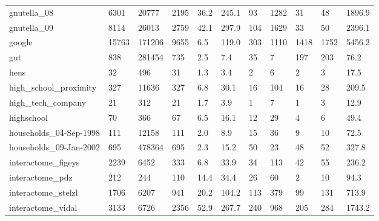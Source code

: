 \begin{longtable}{lllllllllll}
 gnutella\_08                                        & 6301       & 20777     & 2195  & 36.2   & 245.1  & 93    & 1282   & 31     & 48     & 1896.9  \\
 gnutella\_09                                        & 8114       & 26013     & 2759  & 42.1   & 297.9  & 104   & 1629   & 33     & 50     & 2396.1  \\
 google                                             & 15763      & 171206    & 9655  & 6.5    & 119.0  & 303   & 1110   & 1418   & 1752   & 5456.2  \\
 gut                                                & 838        & 281454    & 735   & 2.5    & 7.4    & 35    & 7      & 197    & 203    & 76.2    \\
 hens                                               & 32         & 496       & 31    & 1.3    & 3.4    & 2     & 6      & 2      & 3      & 17.5    \\
 high\_school\_proximity                              & 327        & 11636     & 327   & 6.8    & 30.1   & 16    & 104    & 16     & 28     & 209.5   \\
 high\_tech\_company                                  & 21         & 312       & 21    & 1.7    & 3.9    & 1     & 7      & 1      & 3      & 12.9    \\
 highschool                                         & 70         & 366       & 67    & 6.5    & 16.1   & 12    & 29     & 4      & 6      & 49.4    \\
 households\_04-Sep-1998                             & 111        & 12158     & 111   & 2.0    & 8.9    & 15    & 36     & 9      & 10     & 72.5    \\
 households\_09-Jan-2002                             & 695        & 478364    & 695   & 2.3    & 15.2   & 50    & 23     & 48     & 52     & 327.8   \\
 interactome\_figeys                                 & 2239       & 6452      & 333   & 6.8    & 33.9   & 34    & 113    & 42     & 55     & 236.2   \\
 interactome\_pdz                                    & 212        & 244       & 110   & 14.4   & 34.4   & 26    & 60     & 2      & 10     & 94.3    \\
 interactome\_stelzl                                 & 1706       & 6207      & 941   & 20.2   & 104.2  & 113   & 379    & 99     & 131    & 713.9   \\
 interactome\_vidal                                  & 3133       & 6726      & 2356  & 52.9   & 267.7  & 240   & 968    & 205    & 284    & 1743.2  \\

\end{longtable}

